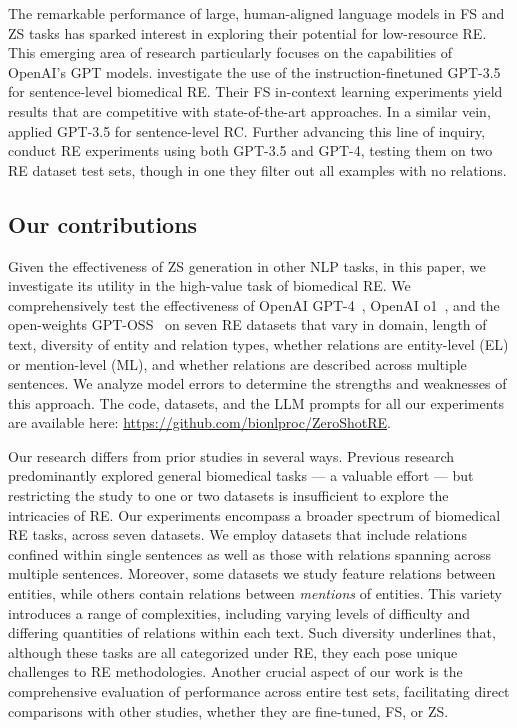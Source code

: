 \documentclass[11pt]{article}
\begin{document}
The remarkable performance of large, human-aligned language models in FS and ZS tasks has sparked interest in exploring their potential for low-resource RE. This emerging area of research particularly focuses on the capabilities of OpenAI's GPT models. \citet{wadhwa-etal-2023-revisiting} investigate the use of the instruction-finetuned GPT-3.5 for sentence-level biomedical RE. Their FS in-context learning experiments yield results that are competitive with  state-of-the-art approaches. In a similar vein, \citet{wang2023large} applied GPT-3.5 for sentence-level RC. Further advancing this line of inquiry, \citet{jahan-etal-2023-evaluation} conduct RE experiments using both GPT-3.5 and GPT-4, testing them on two RE dataset test sets, though in one they filter out all examples with no relations.

\subsection{Our contributions}

Given the effectiveness of ZS generation in other NLP tasks, in this paper, we investigate its utility in the high-value task of biomedical RE.  We comprehensively test the effectiveness of OpenAI GPT-4~\cite{openai2023gpt4}, OpenAI o1~\cite{jaech2024openai}, and the open-weights GPT-OSS~\cite{openai2025gptoss120bgptoss20bmodel} on seven RE datasets that vary in domain, length of text, diversity of entity and relation types, whether relations are entity-level (EL) or mention-level (ML), and whether relations are described across multiple sentences.   We analyze model errors to determine the strengths and weaknesses of this approach. The code, datasets, and the LLM prompts for all our experiments are available here: \url{https://github.com/bionlproc/ZeroShotRE}. 

Our research differs from prior studies in several ways. Previous research predominantly explored general biomedical tasks --- a valuable effort --- but restricting the study to one or two datasets is insufficient to explore the intricacies of RE. Our experiments encompass a broader spectrum of biomedical RE tasks, across seven datasets. We employ datasets that include relations confined within single sentences as well as those with relations spanning across multiple sentences. Moreover, some datasets we study feature relations between entities, while others contain relations between \emph{mentions} of entities. This variety introduces a range of complexities, including varying levels of difficulty and differing quantities of relations within each text. Such diversity underlines that, although these tasks are all categorized under RE, they each pose unique challenges to RE methodologies. Another crucial aspect of our work is the comprehensive evaluation of performance across entire test sets, facilitating direct comparisons with other studies, whether they are fine-tuned, FS, or ZS. %
\end{document}
